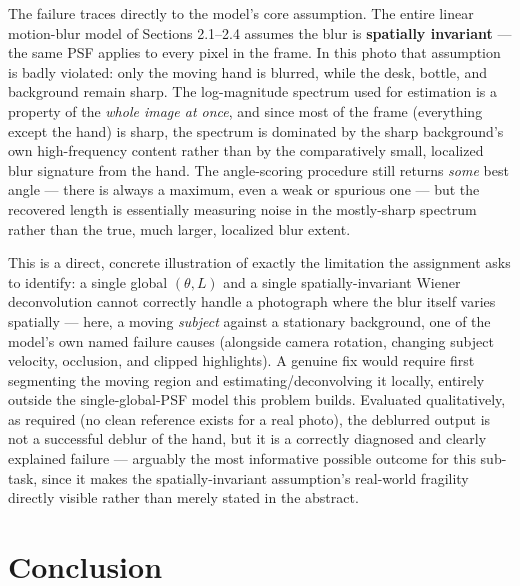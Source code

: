 \documentclass[11pt]{article}
\begin{document}
The failure traces directly to the model's core assumption. The entire linear motion-blur model
of Sections 2.1--2.4 assumes the blur is \textbf{spatially invariant} — the same PSF applies to
every pixel in the frame. In this photo that assumption is badly violated: only the moving hand
is blurred, while the desk, bottle, and background remain sharp. The log-magnitude spectrum used
for estimation is a property of the \emph{whole image at once}, and since most of the frame
(everything except the hand) is sharp, the spectrum is dominated by the sharp background's own
high-frequency content rather than by the comparatively small, localized blur signature from the
hand. The angle-scoring procedure still returns \emph{some} best angle — there is always a
maximum, even a weak or spurious one — but the recovered length is essentially measuring noise
in the mostly-sharp spectrum rather than the true, much larger, localized blur extent.

This is a direct, concrete illustration of exactly the limitation the assignment asks to
identify: a single global $(\theta,L)$ and a single spatially-invariant Wiener deconvolution
cannot correctly handle a photograph where the blur itself varies spatially — here, a moving
\emph{subject} against a stationary background, one of the model's own named failure causes
(alongside camera rotation, changing subject velocity, occlusion, and clipped highlights). A
genuine fix would require first segmenting the moving region and estimating/deconvolving it
locally, entirely outside the single-global-PSF model this problem builds. Evaluated
qualitatively, as required (no clean reference exists for a real photo), the deblurred output is
not a successful deblur of the hand, but it is a correctly diagnosed and clearly explained
failure — arguably the most informative possible outcome for this sub-task, since it makes the
spatially-invariant assumption's real-world fragility directly visible rather than merely stated
in the abstract.

\section{Conclusion}
\end{document}
